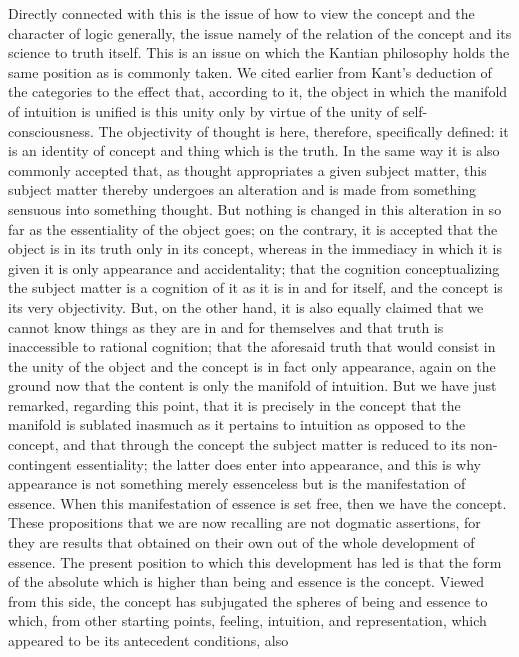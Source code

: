 Directly connected with this is
the issue of how to view the concept
and the character of logic generally,
the issue namely of the relation of
the concept and its science to truth itself.
This is an issue on which the Kantian philosophy
holds the same position as is commonly taken.
We cited earlier from Kant's deduction of the categories to the effect that,
according to it,
the object in which the manifold of intuition is unified is
this unity only by virtue of the unity of self-consciousness.
The objectivity of thought is here, therefore, specifically defined:
it is an identity of concept
and thing which is the truth.
In the same way it is also commonly accepted
that, as thought appropriates a given subject matter, this subject matter
thereby undergoes an alteration and is made from something sensuous
into something thought.
But nothing is changed in this alteration in so
far as the essentiality of the object goes;
on the contrary, it is accepted that
the object is in its truth only in its concept,
 whereas in the immediacy in
which it is given it is only appearance and accidentality;
that the cognition
conceptualizing the subject matter is a cognition of it as it is in and for itself,
and the concept is its very objectivity.
But, on the other hand, it is also
equally claimed that we cannot know things as they are in and for themselves
and that truth is inaccessible to rational cognition;
that the aforesaid truth
that would consist in the unity of the object and the concept is in fact
only appearance, again on the ground now that the content is only the
manifold of intuition. But we have just remarked, regarding this point,
that it is precisely in the concept that the manifold is sublated inasmuch
as it pertains to intuition as opposed to the concept, and that through the
concept the subject matter is reduced to its non-contingent essentiality;
the latter does enter into appearance, and this is why appearance is not
something merely essenceless but is the manifestation of essence.
When this manifestation of essence is set free,
then we have the concept.
These propositions that we are now recalling
are not dogmatic assertions, for
they are results that obtained on their own out of the whole development
of essence.
 The present position to which this development has led is that
the form of the absolute which is higher than being and essence is the
concept.
 Viewed from this side, the concept has subjugated the spheres of
being and essence to which, from other starting points, feeling, intuition,
and representation, which appeared to be its antecedent conditions, also
